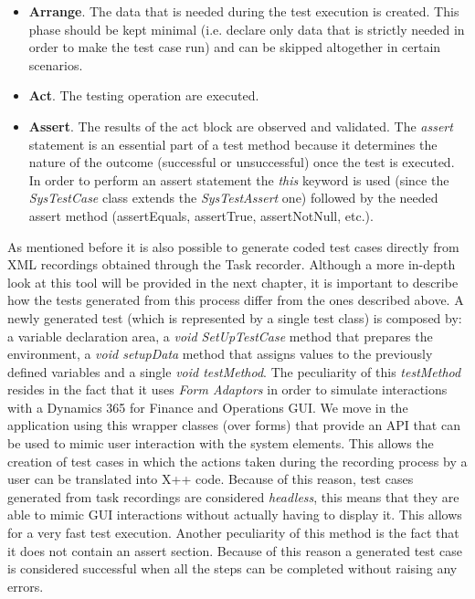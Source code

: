 \begin{itemize}
    \item \textbf{Arrange}. The data that is needed during the test execution is created. This phase should be kept minimal (i.e. declare only data that is strictly needed in order to make the test case run) and can be skipped altogether in certain scenarios.
    \item \textbf{Act}. The testing operation are executed.
    \item \textbf{Assert}. The results of the act block are observed and validated. The \textit{assert} statement is an essential part of a test method because it determines the nature of the outcome (successful or unsuccessful) once the test is executed. In order to perform an assert statement the \textit{this} keyword is used (since the \textit{SysTestCase} class extends the \textit{SysTestAssert} one) followed by the needed assert method (assertEquals, assertTrue, assertNotNull, etc.).
\end{itemize}

As mentioned before it is also possible to generate coded test cases directly from XML recordings obtained through the Task recorder. Although a more in-depth look at this tool will be provided in the next chapter, it is important to describe how the tests generated from this process differ from the ones described above. 
A newly generated test (which is represented by a single test class) is composed by: a variable declaration area, a \textit{void SetUpTestCase} method that prepares the environment, a \textit{void setupData} method that assigns values to the previously defined variables and a single \textit{void testMethod}. The peculiarity of this \textit{testMethod} resides in the fact that it uses \textit{Form Adaptors} in order to simulate interactions with a Dynamics 365 for Finance and Operations GUI. We move in the application using this wrapper classes (over forms) that provide an API that can be used to mimic user interaction with the system elements. This allows the creation of test cases in which the actions taken during the recording process by a user can be translated into X++ code. Because of this reason, test cases generated from task recordings are considered \textit{headless}, this means that they are able to mimic GUI interactions without actually having to display it. This allows for a very fast test execution. Another peculiarity of this method is the fact that it does not contain an assert section. Because of this reason a generated test case is considered successful when all the steps can be completed without raising any errors.

